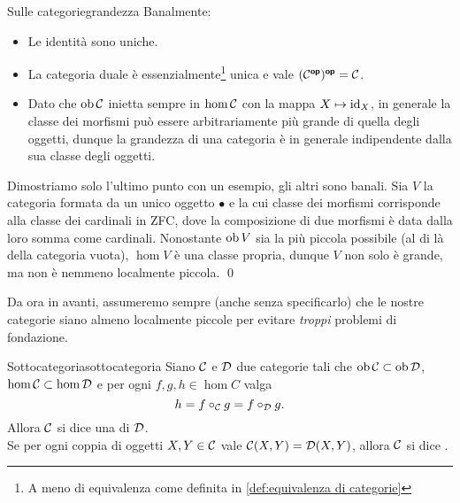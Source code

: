 \documentclass{article}
\renewcommand\C{\mc{C}}
\newcommand\D{\mc{D}}
\begin{document}
\begin{remark}{Sulle categorie}{grandezza}
    Banalmente:\begin{itemize}
        \item Le identità sono uniche.
        \item La categoria duale è essenzialmente\footnote{A meno di equivalenza come definita in \ref{def:equivalenza di categorie}} unica e vale $(\C^\op)^\op = \C$.
        \item Dato che $\ob\C$ inietta sempre in $\hom\C$ con la mappa $X\mapsto \operatorname{id}_X$, in generale la classe dei morfismi può essere arbitrariamente più grande di quella degli oggetti, dunque la grandezza di una categoria è in generale indipendente dalla sua classe degli oggetti.
    \end{itemize} 
    \proof 
    Dimostriamo solo l'ultimo punto con un esempio, gli altri sono banali. Sia $V$ la categoria formata da un unico oggetto $\bullet$ e la cui classe dei morfismi corrisponde alla classe dei cardinali in ZFC, dove la composizione di due morfismi è data dalla loro somma come cardinali. Nonostante $\operatorname{ob} V$ sia la più piccola possibile (al di là della categoria vuota), $\hom V$ è una classe propria, dunque $V$ non solo è grande, ma non è nemmeno localmente piccola.
    \qed
\end{remark}

Da ora in avanti, assumeremo sempre (anche senza specificarlo) che le nostre categorie siano almeno localmente piccole per evitare \textit{troppi} problemi di fondazione.

\begin{definition}{Sottocategoria}{sottocategoria}
    Siano $\C$ e $\D$ due categorie tali che $\ob\C \subset \ob\D$, $\hom\C \subset \hom\D$ e per ogni $f,g,h \in \hom C$ valga 
    \[h = f\circ_\C g = f\circ_\D g.\]
    Allora $\C$ si dice una  di $\D$.\\
    Se per ogni coppia di oggetti $X,Y \in \C$ vale $\C(X,Y)=\D(X,Y)$, allora $\C$ si dice .
\end{definition}
\end{document}
